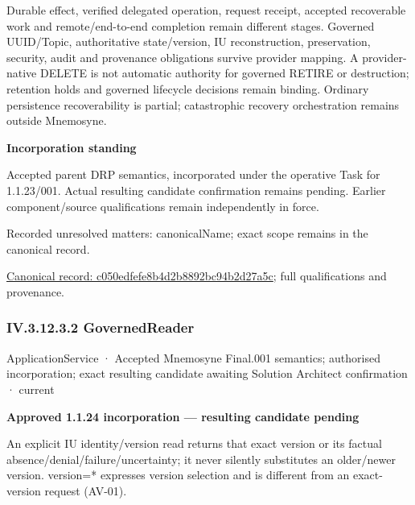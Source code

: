 Durable effect, verified delegated operation, request receipt, accepted recoverable work and remote/end-to-end completion remain different stages. Governed UUID/Topic, authoritative state/version, IU reconstruction, preservation, security, audit and provenance obligations survive provider mapping. A provider-native DELETE is not automatic authority for governed RETIRE or destruction; retention holds and governed lifecycle decisions remain binding. Ordinary persistence recoverability is partial; catastrophic recovery orchestration remains outside Mnemosyne.



\par\medskip\textbf{Incorporation standing}\par


Accepted parent DRP semantics, incorporated under the operative Task for 1.1.23/001. Actual resulting candidate confirmation remains pending. Earlier component/source qualifications remain independently in force.


{\small Recorded unresolved matters: canonicalName; exact scope remains in the canonical record.}\par
{\footnotesize \href{../../../../continuum/application/application-service/c050edfefe8b4d2b8892bc94b2d27a5c.md}{Canonical record: c050edfefe8b4d2b8892bc94b2d27a5c}; full qualifications and provenance.}\par
\subsubsection*{IV.3.12.3.2 GovernedReader}
\label{navigation:IV.3.12.3.2}

\label{element:410a938f42964474b7cf5655815dc830}
{\small ApplicationService · Accepted Mnemosyne Final.001 semantics; authorised incorporation; exact resulting candidate awaiting Solution Architect confirmation · current}\par

\par\medskip\textbf{Approved 1.1.24 incorporation — resulting candidate pending}\par


An explicit IU identity/version read returns that exact version or its factual absence/denial/failure/uncertainty; it never silently substitutes an older/newer version. version=* expresses version selection and is different from an exact-version request (AV-01).



